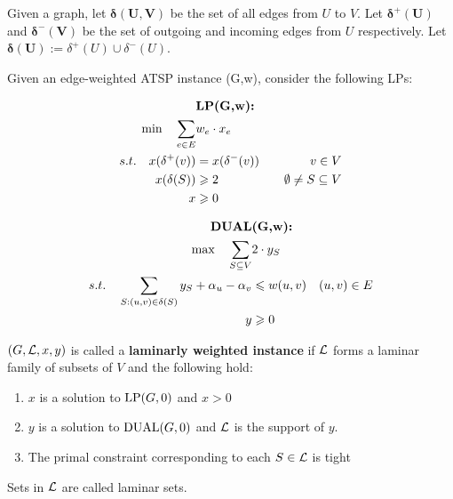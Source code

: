 \documentclass[./main.tex]{subfiles}
\begin{document}
	\begin{definition} 
		Given a graph, let $\bm{\delta(U,V)}$ be the set of all edges from $U$ to $V$. 
		Let $\bm{\delta^+(U)}$ and $\bm{\delta^-(V)}$ be the set of outgoing and incoming edges from $U$ respectively. 
		Let $\bm{\delta(U)}:=\delta^+(U)\cup \delta^-(U)$.
	\end{definition}\vspace{4mm}

	\begin{definition} 
		Given an edge-weighted ATSP instance (G,w), consider the following LPs:\\
		\begin{minipage}{0.20\textwidth}
			\begin{align*}
				&\textbf{\textup{LP}(G,w):}\\
				\min\quad\sum_{e\in E}&w_e\cdot x_e\\
				s.t.\quad x(\delta^+(v)) & = x(\delta^-(v))\quad & v\in V                     \\
				x(\delta(S))             & \geqslant 2\quad           & \emptyset\neq S\subseteq V \\
				x&\geqslant 0
			\end{align*}
		\end{minipage}
		\hfill\vline\hfill
		\begin{minipage}{0.55\textwidth}
			\begin{align*}
				\textbf{\textup{DUAL}}                                                 & \textbf{(G,w):}             \\
				\max\quad\sum_{S\subseteq V}                                  & 2\cdot y_S                  \\
				s.t.\quad\sum_{S:(u,v)\in \delta(S)}y_S + \alpha_u - \alpha_v & \leqslant w(u,v)\quad (u,v)\in E \\
				y                                                             & \geqslant 0
			\end{align*}
		\end{minipage}
		\vspace{7mm}
	\end{definition}

	\begin{definition} 
		$(G,\mathcal{L},x,y)$ is called a \textbf{laminarly weighted instance} if $\mathcal{L}$ forms a laminar family of subsets of $V$ and the following hold:
		\begin{enumerate}
			\item $x$ is a solution to $\textup{LP}(G,0)$ and $x > 0$
			\item $y$ is a solution to $\textup{DUAL}(G,0)$ and $\mathcal{L}$ is the support of $y$.
			\item The primal constraint corresponding to each $S\in \mathcal{L}$ is tight
		\end{enumerate}
		Sets in $\mathcal{L}$ are called laminar sets.
	\end{definition}
\end{document}
